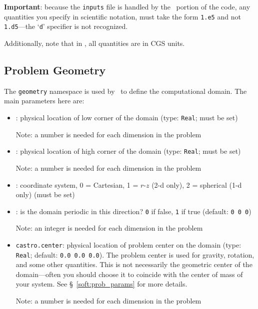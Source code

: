 {\bf Important}: because the {\tt inputs} file is handled by the \cpp\ portion of
the code, any quantities you specify in scientific notation, must take the
form {\tt 1.e5} and not {\tt 1.d5}---the `{\tt d}' specifier is not recognized.

Additionally, note that in \castro, all quantities are in CGS units.

\subsection{Problem Geometry}

The {\tt geometry} namespace is used by \boxlib\ to define the
computational domain.  The main parameters here are:
\begin{itemize}
\item {}: physical location of low corner of the
domain (type: {\tt Real}; must be set)

  Note: a number is needed for each dimension in the problem
  
\item {}: physical location of high corner of the
domain (type: {\tt Real}; must be set)

  Note: a number is needed for each dimension in the problem
  
\item {}: coordinate system, 0 = Cartesian,
1 = $r$-$z$ (2-d only), 2 = spherical (1-d only) (must be set)

\item {}: is the domain periodic in this direction?
  {\tt 0} if false, {\tt 1} if true  (default: {\tt 0 0 0}) 

  Note: an integer is needed for each dimension in the problem

\item {\tt castro.center}: physical location of problem center on the
  domain (type: {\tt Real}; default: {\tt 0.0 0.0 0.0}).  The problem
  center is used for gravity, rotation, and some other quantities.
  This is not necessarily the geometric center of the domain---often
  you should choose it to coincide with the center of mass of your
  system.  See \S~\ref{soft:prob_params} for more details.

  Note: a number is needed for each dimension in the problem

\end{itemize}

